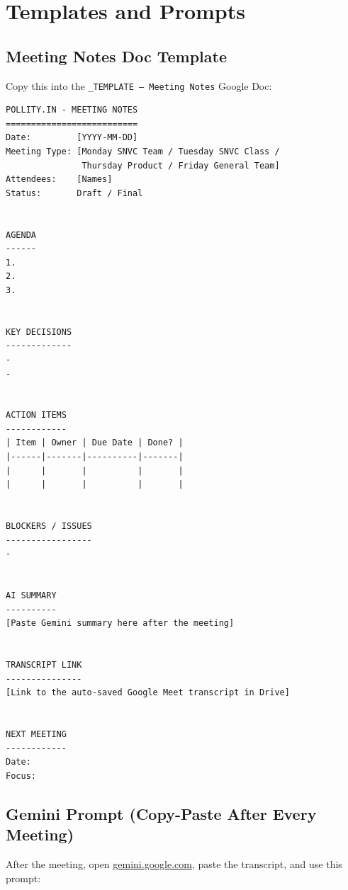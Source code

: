 \documentclass[11pt, a4paper]{article}
\begin{document}
\newpage

\section{Templates and Prompts}

\subsection{Meeting Notes Doc Template}

Copy this into the \texttt{\_TEMPLATE -- Meeting Notes} Google Doc:

\begin{tcolorbox}[colback=codegray, colframe=codeframe, sharp corners, fontupper=\small\ttfamily, breakable]
\begin{verbatim}
POLLITY.IN - MEETING NOTES
==========================
Date:         [YYYY-MM-DD]
Meeting Type: [Monday SNVC Team / Tuesday SNVC Class /
               Thursday Product / Friday General Team]
Attendees:    [Names]
Status:       Draft / Final


AGENDA
------
1.
2.
3.


KEY DECISIONS
-------------
-
-


ACTION ITEMS
------------
| Item | Owner | Due Date | Done? |
|------|-------|----------|-------|
|      |       |          |       |
|      |       |          |       |


BLOCKERS / ISSUES
-----------------
-


AI SUMMARY
----------
[Paste Gemini summary here after the meeting]


TRANSCRIPT LINK
---------------
[Link to the auto-saved Google Meet transcript in Drive]


NEXT MEETING
------------
Date:
Focus:
\end{verbatim}
\end{tcolorbox}

\subsection{Gemini Prompt (Copy-Paste After Every Meeting)}

After the meeting, open \href{https://gemini.google.com}{gemini.google.com}, paste the transcript, and use this prompt:
\end{document}
